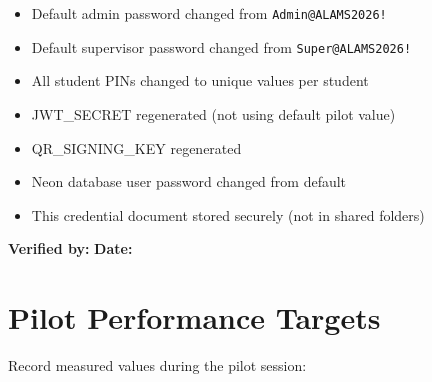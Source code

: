 \begin{itemize}[label={\faSquare[regular]}, itemsep=6pt]
  \item[$\square$] Default admin password changed from \texttt{Admin@ALAMS2026!}
  \item[$\square$] Default supervisor password changed from \texttt{Super@ALAMS2026!}
  \item[$\square$] All student PINs changed to unique values per student
  \item[$\square$] JWT\_SECRET regenerated (not using default pilot value)
  \item[$\square$] QR\_SIGNING\_KEY regenerated
  \item[$\square$] Neon database user password changed from default
  \item[$\square$] This credential document stored securely (not in shared folders)
\end{itemize}

\textbf{Verified by:} \underline{\hspace{6cm}} \quad \textbf{Date:} \underline{\hspace{3cm}}

\section{Pilot Performance Targets}

Record measured values during the pilot session:

